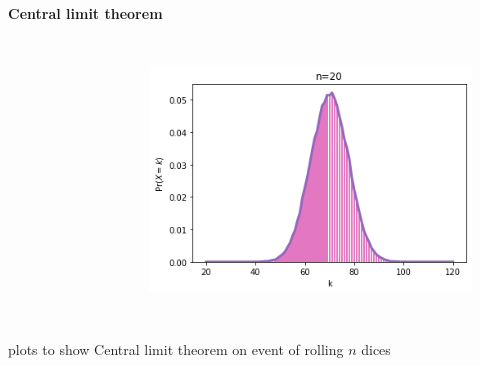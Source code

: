 \documentclass{beamer}
\begin{document}
\begin{frame}{\textbf{Central limit theorem}}
\begin{columns}[onlytextwidth]
\begin{figure}
        \label{fig:my_label}
    \end{figure}
    \begin{figure}
        \centering
        \includegraphics[scale=0.22]{figures/CLT/n=20.png}
        \label{fig:my_label}
    \end{figure}
    \end{columns}
    \begin{center}
          {\tiny plots to show   Central limit theorem on event of rolling $n$ dices}%
    \end{center}
\end{frame}
\end{document}
